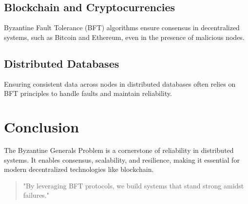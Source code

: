 \documentclass[12pt]{article}
\theoremstyle{remark}
\begin{document}
\subsection{Blockchain and Cryptocurrencies}
Byzantine Fault Tolerance (BFT) algorithms ensure consensus in decentralized systems, such as Bitcoin and Ethereum, even in the presence of malicious nodes.

\subsection{Distributed Databases}
Ensuring consistent data across nodes in distributed databases often relies on BFT principles to handle faults and maintain reliability.

\section*{\centering Conclusion}
The Byzantine Generals Problem is a cornerstone of reliability in distributed systems. It enables consensus, scalability, and resilience, making it essential for modern decentralized technologies like blockchain.


\newpage



\begin{quote}
"By leveraging BFT protocols, we build systems that stand strong amidst failures."
\end{quote}
\end{document}
